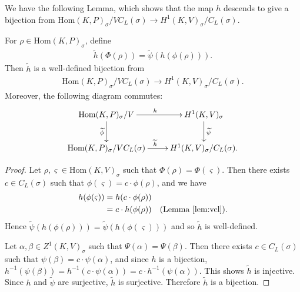	We have the following Lemma, which shows that the map $h$ descends to give a bijection from $\mathrm{Hom}(K, P)_\sigma /VC_L(\sigma) \rightarrow H^1(K, V)_{\sigma}/C_L(\sigma)$.

\begin{lemma}
	For $\rho \in \mathrm{Hom}(K, P)_\sigma$, define
	\begin{align*}
		\widetilde{h}(\Phi(\rho)) = \widetilde{\psi}(h(\phi(\rho))).
	\end{align*}
	Then $\widetilde{h}$ is a well-defined bijection from
	\begin{align*}
		\mathrm{Hom}(K, P)_\sigma / VC_L(\sigma) \rightarrow H^1(K, V)_\sigma/C_L(\sigma).
	\end{align*}
	Moreover, the following diagram commutes:
  \begin{align*}
    \xymatrix{
		\mathrm{Hom}(K, P)_{\sigma}/V \ar[r]^h \ar[d]_{\widetilde{\phi}} & H^{1}(K, V)_\sigma \ar[d]^{\widetilde{\psi}} \\
		\mathrm{Hom}(K, P)_{\sigma}/VC_L(\sigma) \ar[r]^{\widetilde{h}} & H^{1}(K, V)_\sigma/C_L(\sigma).
    }
  \end{align*}
\end{lemma}
\begin{proof}
Let $\rho, \varsigma \in \mathrm{Hom}(K, V)_\sigma$ such that $\Phi(\rho) = \Phi(\varsigma)$. Then there exists $c \in C_L(\sigma)$ such that $\phi(\varsigma) = c\cdot\phi(\rho)$, and we have
\begin{align*}
	h(\phi(\varsigma)) &= h(c \cdot\phi(\rho)) \\
	&= c \cdot h(\phi(\rho))\quad(\textrm{Lemma }\ref{lem:vcl}). 
\end{align*}
Hence $\widetilde{\psi}(h(\phi(\rho))) = \widetilde{\psi}(h(\phi(\varsigma)))$ and so $\widetilde{h}$ is well-defined.

Let $\alpha, \beta \in Z^1(K, V)_\sigma$ such that $\Psi(\alpha) = \Psi(\beta)$. Then there exists $c \in C_L(\sigma)$ such that $\psi(\beta) = c \cdot \psi(\alpha)$, and since $h$ is a bijection, $h^{-1}(\psi(\beta)) = h^{-1}(c \cdot \psi(\alpha)) = c \cdot h^{-1}(\psi(\alpha))$. This shows $\widetilde{h}$ is injective. Since $h$ and $\widetilde{\psi}$ are surjective, $\widetilde{h}$ is surjective. Therefore $\widetilde{h}$ is a bijection.
\end{proof}

